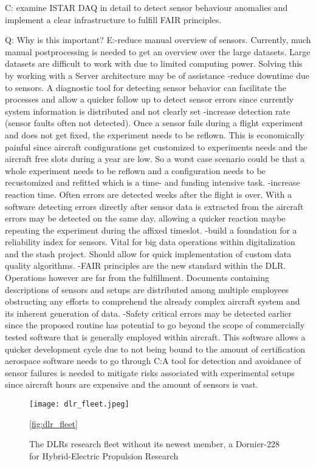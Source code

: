 C: examine ISTAR DAQ in detail to detect sensor behaviour anomalies and implement a clear infrastructure to fulfill FAIR principles.


Q: Why is this important?
E:-reduce manual overview of sensors. Currently, much manual postprocessing is needed to get an overview over the large datasets. Large datasets are difficult to work with due to limited computing power. Solving this by working with a Server architecture may be of assistance
-reduce downtime due to sensors. A diagnostic tool for detecting sensor behavior can facilitate the processes and allow a quicker follow up to detect sensor errors since currently system information is distributed and not clearly set
-increase detection rate (sensor faults often not detected). Once a sensor fails during a flight experiment and does not get fixed, the experiment needs to be reflown. This is economically painful since aircraft configurations get customized to experiments needs and the aircraft free slots during a year are low. So a worst case scenario could be that a whole experiment needs to be reflown and a configuration needs to be recustomized and refitted which is a time- and funding intensive task.
-increase reaction time. Often errors are detected weeks after the flight is over. With a software detecting errors directly after sensor data is extracted from the aircraft errors may be detected on the same day. allowing a quicker reaction maybe repeating the experiment during the affixed timeslot.
-build a foundation for a reliability index for sensors. Vital for big data operations within digitalization and the stash project. Should allow for quick implementation of custom data quality algorithms.
-FAIR principles are the new standard within the DLR. Operations however are far from the fulfillment. Documents containing descriptions of sensors and setups are distributed among multiple employees obstructing any efforts to comprehend the already complex aircraft system and its inherent generation of data.
-Safety critical errors may be detected earlier since the proposed routine has potential to go beyond the scope of commercially tested software that is generally employed within aircraft. This software allows a quicker development cycle due to not being bound to the amount of certification aerospace software needs to go through
C:A tool for detection and avoidance of sensor failures is needed to mitigate risks associated with experimental setups since aircraft hours are expensive and the amount of sensors is vast.

\begin{figure}
    \centering
    \texttt{[image: dlr\_fleet.jpeg]}
    \caption{The DLRs research fleet without its newest member, a Dornier-228 for Hybrid-Electric Propulsion Research \cite{dlr_dlr-fleet_2018}}
    \ref{fig:dlr_fleet}
\end{figure}

